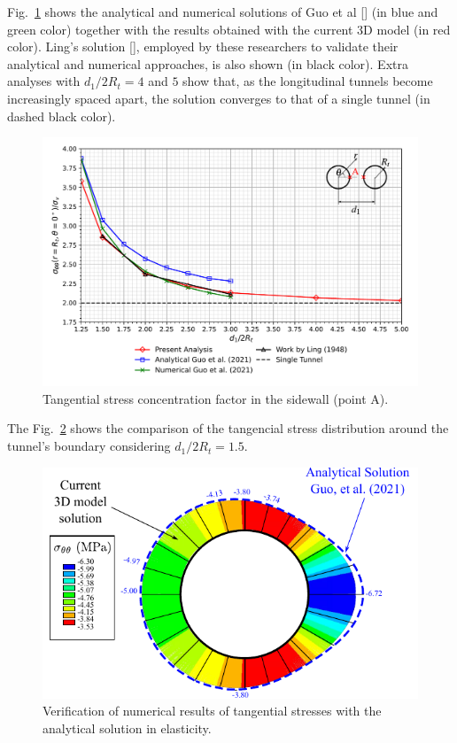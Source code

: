 \documentclass[a4paper,fleqn]{cas-sc}
\begin{document}
Fig.~\ref{Tangencial stress concentration factor in A} shows the analytical and numerical solutions of Guo et al [] (in blue and green color) together with the results obtained with the current 3D model (in red color). Ling's solution [], employed by these researchers to validate their analytical and numerical approaches, is also shown (in black color). Extra analyses with $d_1/2R_t = 4$ and $5$ show that, as the longitudinal tunnels become increasingly spaced apart, the solution converges to that of a single tunnel (in dashed black color).

\begin{figure}[h!]
	\centering
	\includegraphics[scale=0.7]{Tangencial stress concentration factor in A.pdf}
	\caption{Tangential stress concentration factor in the sidewall (point A).}
	\label{Tangencial stress concentration factor in A}
\end{figure}
\FloatBarrier

The Fig.~\ref{GUO_FIG1} shows the comparison of the tangencial stress distribution around the tunnel's boundary considering  $d_1/2R_t = 1.5$.
\begin{figure}[h!]
	\centering
	\includegraphics[scale=1]{GUO_FIG1.pdf}
	\caption{Verification of numerical results of tangential stresses with the analytical solution in elasticity.}
	\label{GUO_FIG1}
\end{figure}
\FloatBarrier
\end{document}
